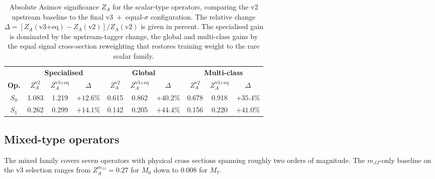 \begin{table}[htbp]
  \centering
  \caption{Absolute Asimov significance $Z_A$ for the scalar-type operators, comparing the v2 upstream baseline to the final v3~+~equal-$\sigma$ configuration. The relative change $\Delta=[Z_A(\text{v3+eq})-Z_A(\text{v2})]/Z_A(\text{v2})$ is given in percent. The specialised gain is dominated by the upstream-tagger change, the global and multi-class gains by the equal signal cross-section reweighting that restores training weight to the rare scalar family.}
  \label{tab:sens_gain_S}
  \begin{tabular}{|c|cc|c|cc|c|cc|c|}
    \hline
    & \multicolumn{3}{c|}{\textbf{Specialised}} & \multicolumn{3}{c|}{\textbf{Global}} & \multicolumn{3}{c|}{\textbf{Multi-class}} \\
    \textbf{Op.} & $Z_A^\text{v2}$ & $Z_A^\text{v3+eq}$ & $\Delta$ & $Z_A^\text{v2}$ & $Z_A^\text{v3+eq}$ & $\Delta$ & $Z_A^\text{v2}$ & $Z_A^\text{v3+eq}$ & $\Delta$ \\
    \hline
    $S_0$ & 1.083 & 1.219 & $+12.6\%$ & 0.615 & 0.862 & $+40.2\%$ & 0.678 & 0.918 & $+35.4\%$ \\
    $S_1$ & 0.262 & 0.299 & $+14.1\%$ & 0.142 & 0.205 & $+44.4\%$ & 0.156 & 0.220 & $+41.0\%$ \\
    \hline
  \end{tabular}
\end{table}

\subsection{Mixed-type operators}
\label{sec:sens_mixed}

The mixed family covers seven operators with physical cross sections spanning roughly two orders of magnitude. The $m_{JJ}$-only baseline on the v3 selection ranges from $Z_A^{m_{JJ}}=0.27$ for $M_0$ down to $0.008$ for $M_7$.

